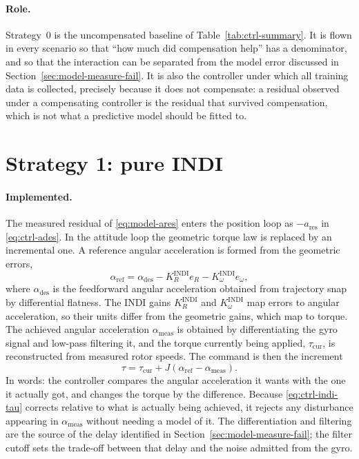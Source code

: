 \paragraph{Role.} Strategy~0 is the uncompensated baseline of Table~\ref{tab:ctrl-summary}. It is
flown in every scenario so that ``how much did compensation help'' has a denominator, and so that
the interaction can be separated from the model error discussed in
Section~\ref{sec:model-measure-fail}. It is also the controller under
which all training data is collected, precisely because it does not compensate: a residual observed
under a compensating controller is the residual that survived compensation, which is not what a
predictive model should be fitted to.

\section{Strategy 1: pure INDI}
\label{sec:ctrl-s1}

\paragraph{Implemented.} The measured residual of \eqref{eq:model-ares} enters the position loop as
$-a_{\mathrm{res}}$ in \eqref{eq:ctrl-ades}. In the attitude loop the geometric torque law is
replaced by an incremental one. A reference angular acceleration is formed from the geometric
errors,
%
\begin{equation}
  \alpha_{\mathrm{ref}} = \alpha_{\mathrm{des}} - K_R^{\mathrm{INDI}} e_R - K_\omega^{\mathrm{INDI}} e_\omega,
  \label{eq:ctrl-alpharef}
\end{equation}
%
where $\alpha_{\mathrm{des}}$ is the feedforward angular acceleration obtained from trajectory snap
by differential flatness. The INDI gains $K_R^{\mathrm{INDI}}$ and $K_\omega^{\mathrm{INDI}}$ map
errors to angular acceleration, so their units differ from the geometric gains, which map to torque. The achieved angular acceleration $\alpha_{\mathrm{meas}}$ is obtained by
differentiating the gyro signal and low-pass filtering it, and the torque currently being applied,
$\tau_{\mathrm{cur}}$, is reconstructed from measured rotor speeds. The command is then the
increment
%
\begin{equation}
  \tau = \tau_{\mathrm{cur}} + J\left(\alpha_{\mathrm{ref}} - \alpha_{\mathrm{meas}}\right).
  \label{eq:ctrl-indi-tau}
\end{equation}
%
In words: the controller compares the angular acceleration it wants with the one it actually got, and
changes the torque by the difference. Because \eqref{eq:ctrl-indi-tau} corrects relative to what is actually being achieved, it rejects
any disturbance appearing in $\alpha_{\mathrm{meas}}$ without needing a model of it. The
differentiation and filtering are the source of the delay identified in
Section~\ref{sec:model-measure-fail}; the filter cutoff sets the trade-off between that delay and
the noise admitted from the gyro.

